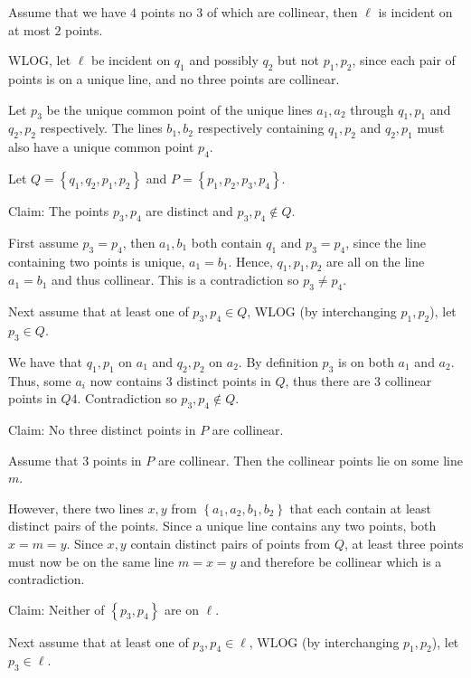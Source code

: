 \documentclass[a4paper, 11pt]{article}
\def\set#1{\left\{ #1 \right\}}
\begin{document}
\begin{itemize}
		Assume that we have $4$ points no $3$ of which are collinear, then $\ell$ is incident on at most $2$ points. 
		
		WLOG, let $\ell$ be incident on $q_1$ and possibly $q_2$ but not $p_1,p_2$, since each pair of points is on a unique line, and no three points are collinear.

		Let $p_3$ be the unique common point of the unique lines $a_1,a_2$ through $q_1,p_1$ and $q_2,p_2$ respectively. The lines $b_1,b_2$ respectively containing $q_1,p_2$ and $q_2,p_1$ must also have a unique common point $p_4$.
		
		Let $Q=\set{q_1,q_2,p_1,p_2}$ and $P=\set{p_1,p_2,p_3,p_4}$.

		Claim: The points $p_3,p_4$ are distinct and $p_3,p_4\notin Q$.
		
		\begin{mdframed}
			First assume $p_3=p_4$, then $a_1,b_1$ both contain $q_1$ and $p_3=p_4$, since the line containing two points is unique, $a_1=b_1$. Hence, $q_1,p_1,p_2$ are all on the line $a_1=b_1$ and thus collinear. This is a contradiction so  $p_3\neq p_4$. 

			Next assume that at least one of $p_3,p_4\in Q$, WLOG (by interchanging $p_1,p_2$), let $p_3\in Q$.

			We have that $q_1,p_1$ on $a_1$ and $q_2,p_2$ on $a_2$. By definition $p_3$ is on both $a_1$ and $a_2$. Thus, some $a_i$ now contains $3$ distinct points in $Q$, thus there are $3$ collinear points in $Q4$. Contradiction so $p_3,p_4\notin Q$.
		\end{mdframed}

		Claim: No three distinct points in $P$ are collinear. 

		\begin{mdframed}
			Assume that $3$ points in $P$ are collinear. Then the collinear points lie on some line $m$. 

			However, there two lines $x,y$ from $\set{a_1,a_2,b_1,b_2}$ that each contain at least distinct pairs of the points. Since a unique line contains any two points, both $x=m=y$. Since $x,y$ contain distinct pairs of points from $Q$, at least three points must now be on the same line $m=x=y$ and therefore be collinear which is a contradiction.
		\end{mdframed}

		Claim: Neither of $\set{p_3,p_4}$ are on $\ell$. 

		\begin{mdframed}
			Next assume that at least one of $p_3,p_4\in\ell$, WLOG (by interchanging $p_1,p_2$), let $p_3\in \ell$.


\end{mdframed}
\end{itemize}
\end{document}
